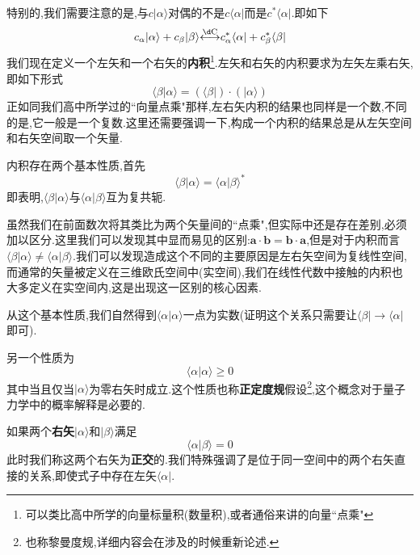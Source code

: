 \documentclass[lang=cn,newtx,10pt,scheme=chinese,thmcnt=section]{elegantbook}
\begin{document}
特别的,我们需要注意的是,与$c|\alpha\rangle$对偶的不是$c\langle\alpha|$而是$c^*\langle\alpha|$.即如下
\begin{equation}
	c_\alpha|\alpha\rangle+c_\beta|\beta\rangle\overset{\mathrm{\d C}}{\operatorname*{\longleftrightarrow}}c_\alpha^*\langle\alpha|+c_\beta^*\langle\beta|
\end{equation}
我们现在定义一个左矢和一个右矢的\textbf{内积}\footnote{可以类比高中所学的向量标量积(数量积),或者通俗来讲的向量``点乘"}.左矢和右矢的内积要求为左矢左乘右矢,即如下形式
\begin{equation}
	\langle\beta|\alpha\rangle=(\langle\beta|)\cdot(|\alpha\rangle)
\end{equation}
正如同我们高中所学过的``向量点乘"那样,左右矢内积的结果也同样是一个数,不同的是,它一般是一个复数.这里还需要强调一下,构成一个内积的结果总是从左矢空间和右矢空间取一个矢量.

内积存在两个基本性质,首先
\begin{equation}\label{eq1.9}
	\langle\beta|\alpha\rangle=\langle\alpha|\beta\rangle^*
\end{equation}
即表明,$\langle\beta|\alpha\rangle$与$\langle\alpha|\beta\rangle$互为复共轭.\\
\begin{remark}
	虽然我们在前面数次将其类比为两个矢量间的``点乘",但实际中还是存在差别,必须加以区分.这里我们可以发现其中显而易见的区别:$\mathbf{a}\cdot\mathbf{b}=\mathbf{b}\cdot\mathbf{a}$,但是对于内积而言$\langle\beta|\alpha\rangle\ne\langle\alpha|\beta\rangle$.我们可以发现造成这个不同的主要原因是左右矢空间为复线性空间,而通常的矢量被定义在三维欧氏空间中(实空间),我们在线性代数中接触的内积也大多定义在实空间内,这是出现这一区别的核心因素.
\end{remark}

从这个基本性质,我们自然得到$\langle\alpha|\alpha\rangle$一点为实数(证明这个关系只需要让$\langle\beta|\rightarrow\langle\alpha|$即可).

另一个性质为
\begin{equation}
	\langle\alpha|\alpha\rangle\geqslant0
\end{equation}
其中当且仅当$|\alpha\rangle$为零右矢时成立.这个性质也称\textbf{正定度规}假设\footnote{也称黎曼度规,详细内容会在涉及的时候重新论述.},这个概念对于量子力学中的概率解释是必要的.

如果两个\textbf{右矢}$|\alpha\rangle$和$|\beta\rangle$满足
\begin{equation}
	\langle\alpha|\beta\rangle=0
\end{equation}
此时我们称这两个右矢为\textbf{正交}的.我们特殊强调了是位于同一空间中的两个右矢直接的关系,即使式子中存在左矢$\langle\alpha|$.
\end{document}
